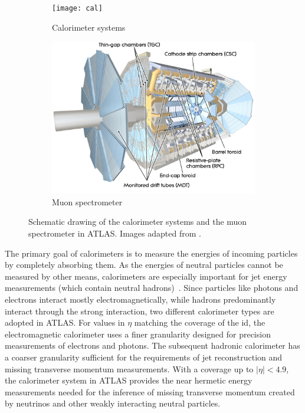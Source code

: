 \begin{figure}
	\centering
	\begin{subfigure}[b]{0.45\linewidth}
		\centering\texttt{[image: cal]}
		\caption{Calorimeter systems\label{fig:calorimeters}}
	\end{subfigure}\hfill
	\begin{subfigure}[b]{0.45\linewidth}
		\centering\includegraphics[width=\textwidth]{ms}
		\caption{Muon spectrometer\label{fig:muon_system}}
	\end{subfigure}%
	\caption{Schematic drawing of the  calorimeter systems and  the muon spectrometer in ATLAS. Images adapted from \cite{Pequenao:1095927,Pequenao:1095929}.}\label{fig:cal_ms_schematic}
\end{figure}

The primary goal of calorimeters is to measure the energies of incoming particles by completely absorbing them.
As the energies of neutral particles cannot be measured by other means, calorimeters are especially important for jet energy measurements (which contain neutral hadrons)~\cite{Brock:1354959}.
Since particles like photons and electrons interact mostly electromagnetically, while hadrons predominantly interact through the strong interaction, two different calorimeter types are adopted in ATLAS.
For values in $\eta$ matching the coverage of the \gls{id}, the electromagnetic calorimeter uses a finer granularity designed for precision measurements of electrons and photons.
The subsequent hadronic calorimeter has a coarser granularity sufficient for the requirements of jet reconstruction and missing transverse momentum measurements.
With a coverage up to $\vert\eta\vert <4.9$, the calorimeter system in ATLAS provides the near hermetic energy measurements needed for the inference of missing transverse momentum created by neutrinos and other weakly interacting neutral particles.

